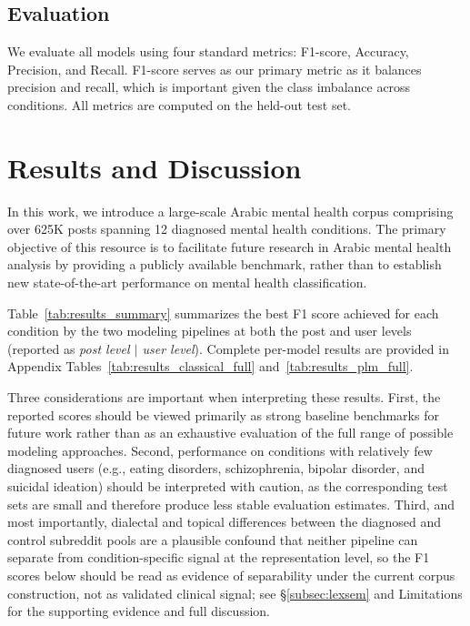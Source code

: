 \documentclass[11pt]{article}
\begin{document}
\subsection{Evaluation}
\label{subsec:eval}

We evaluate all models using four standard metrics: F1-score, Accuracy, Precision, and Recall. F1-score serves as our primary metric as it balances precision and recall, which is important given the class imbalance across conditions. All metrics are computed on the held-out test set.


\section{Results and Discussion}
\label{sec:results}
In this work, we introduce a large-scale Arabic mental health corpus comprising over 625K posts spanning 12 diagnosed mental health conditions. The primary objective of this resource is to facilitate future research in Arabic mental health analysis by providing a publicly available benchmark, rather than to establish new state-of-the-art performance on mental health classification.

Table~\ref{tab:results_summary} summarizes the best F1 score achieved for each condition by the two modeling pipelines at both the post and user levels (reported as \textit{post level $|$ user level}). Complete per-model results are provided in Appendix Tables~\ref{tab:results_classical_full} and~\ref{tab:results_plm_full}.

Three considerations are important when interpreting these results. First, the reported scores should be viewed primarily as strong baseline benchmarks for future work rather than as an exhaustive evaluation of the full range of possible modeling approaches. Second, performance on conditions with relatively few diagnosed users (e.g., eating disorders, schizophrenia, bipolar disorder, and suicidal ideation) should be interpreted with caution, as the corresponding test sets are small and therefore produce less stable evaluation estimates. Third, and most importantly, dialectal and topical differences between the diagnosed and control subreddit pools are a plausible confound that neither pipeline can separate from condition-specific signal at the representation level, so the F1 scores below should be read as evidence of separability under the current corpus construction, not as validated clinical signal; see §\ref{subsec:lexsem} and Limitations for the supporting evidence and full discussion.
\end{document}
